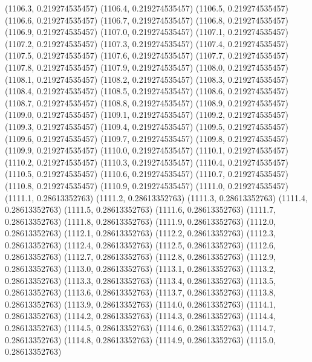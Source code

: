 {					(1106.3, 0.219274535457)
					(1106.4, 0.219274535457)
					(1106.5, 0.219274535457)
					(1106.6, 0.219274535457)
					(1106.7, 0.219274535457)
					(1106.8, 0.219274535457)
					(1106.9, 0.219274535457)
					(1107.0, 0.219274535457)
					(1107.1, 0.219274535457)
					(1107.2, 0.219274535457)
					(1107.3, 0.219274535457)
					(1107.4, 0.219274535457)
					(1107.5, 0.219274535457)
					(1107.6, 0.219274535457)
					(1107.7, 0.219274535457)
					(1107.8, 0.219274535457)
					(1107.9, 0.219274535457)
					(1108.0, 0.219274535457)
					(1108.1, 0.219274535457)
					(1108.2, 0.219274535457)
					(1108.3, 0.219274535457)
					(1108.4, 0.219274535457)
					(1108.5, 0.219274535457)
					(1108.6, 0.219274535457)
					(1108.7, 0.219274535457)
					(1108.8, 0.219274535457)
					(1108.9, 0.219274535457)
					(1109.0, 0.219274535457)
					(1109.1, 0.219274535457)
					(1109.2, 0.219274535457)
					(1109.3, 0.219274535457)
					(1109.4, 0.219274535457)
					(1109.5, 0.219274535457)
					(1109.6, 0.219274535457)
					(1109.7, 0.219274535457)
					(1109.8, 0.219274535457)
					(1109.9, 0.219274535457)
					(1110.0, 0.219274535457)
					(1110.1, 0.219274535457)
					(1110.2, 0.219274535457)
					(1110.3, 0.219274535457)
					(1110.4, 0.219274535457)
					(1110.5, 0.219274535457)
					(1110.6, 0.219274535457)
					(1110.7, 0.219274535457)
					(1110.8, 0.219274535457)
					(1110.9, 0.219274535457)
					(1111.0, 0.219274535457)
					(1111.1, 0.28613352763)
					(1111.2, 0.28613352763)
					(1111.3, 0.28613352763)
					(1111.4, 0.28613352763)
					(1111.5, 0.28613352763)
					(1111.6, 0.28613352763)
					(1111.7, 0.28613352763)
					(1111.8, 0.28613352763)
					(1111.9, 0.28613352763)
					(1112.0, 0.28613352763)
					(1112.1, 0.28613352763)
					(1112.2, 0.28613352763)
					(1112.3, 0.28613352763)
					(1112.4, 0.28613352763)
					(1112.5, 0.28613352763)
					(1112.6, 0.28613352763)
					(1112.7, 0.28613352763)
					(1112.8, 0.28613352763)
					(1112.9, 0.28613352763)
					(1113.0, 0.28613352763)
					(1113.1, 0.28613352763)
					(1113.2, 0.28613352763)
					(1113.3, 0.28613352763)
					(1113.4, 0.28613352763)
					(1113.5, 0.28613352763)
					(1113.6, 0.28613352763)
					(1113.7, 0.28613352763)
					(1113.8, 0.28613352763)
					(1113.9, 0.28613352763)
					(1114.0, 0.28613352763)
					(1114.1, 0.28613352763)
					(1114.2, 0.28613352763)
					(1114.3, 0.28613352763)
					(1114.4, 0.28613352763)
					(1114.5, 0.28613352763)
					(1114.6, 0.28613352763)
					(1114.7, 0.28613352763)
					(1114.8, 0.28613352763)
					(1114.9, 0.28613352763)
					(1115.0, 0.28613352763)
}

